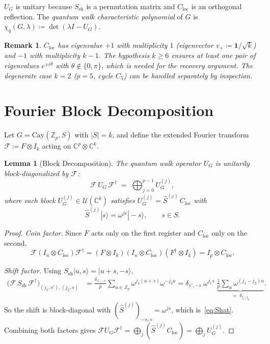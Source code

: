 \documentclass[12pt]{article}
\newtheorem{lemma}[theorem]{Lemma}
\newtheorem{remark}[theorem]{Remark}
\newcommand{\Z}{\mathbb{Z}}
\newcommand{\C}{\mathbb{C}}
\newcommand{\Cay}{\mathrm{Cay}}
\newcommand{\eqdef}{\coloneqq}
\newcommand{\ket}[1]{|#1\rangle}
\newcommand{\Uj}{U_G^{(j)}}
\newcommand{\Shat}{\hat{S}^{(j)}}
\newcommand{\cF}{\mathcal{F}}
\newcommand{\vplus}{v_+}
\begin{document}
$U_G$ is unitary because $S_{\mathrm{sh}}$ is a permutation matrix and
$C_{\mathrm{loc}}$ is an orthogonal reflection.  The \emph{quantum walk
characteristic polynomial} of $G$ is $\chi_q(G, \lambda) \eqdef
\det(\lambda I - U_G)$.

\begin{remark}\label{rem:small}
  $C_{\mathrm{loc}}$ has eigenvalue $+1$ with multiplicity $1$
  (eigenvector $\vplus \eqdef \mathbf{1}/\sqrt{k}$) and $-1$ with
  multiplicity $k-1$.  The hypothesis $k \geq 6$ ensures at least one pair
  of eigenvalues $e^{\pm i\theta}$ with $\theta \notin \{0,\pi\}$, which
  is needed for the recovery argument.  The degenerate case $k=2$
  ($p=5$, cycle $C_5$) can be handled separately by inspection.
\end{remark}

\section{Fourier Block Decomposition}
\label{sec:decomp}

Let $G = \Cay(\Z_p, S)$ with $|S| = k$, and define the extended Fourier
transform $\cF \eqdef F \otimes I_k$ acting on $\C^p \otimes \C^k$.

\begin{lemma}[Block Decomposition]\label{lem:block}
  The quantum walk operator $U_G$ is unitarily block-diagonalized by $\cF$:
  \[
    \cF\, U_G\, \cF^\dagger \;=\; \bigoplus_{j=0}^{p-1} \Uj,
  \]
  where each block $\Uj \in \mathcal{U}(\C^k)$ satisfies
  $\Uj = \Shat\, C_{\mathrm{loc}}$ with
  \begin{equation}\label{eq:Shat}
    \Shat\ket{s} = \omega^{js}\ket{-s}, \qquad s \in S.
  \end{equation}
\end{lemma}

\begin{proof}
  \textit{Coin factor.}
  Since $F$ acts only on the first register and $C_{\mathrm{loc}}$ only on
  the second,
  \[
    \cF(I_n \otimes C_{\mathrm{loc}})\cF^\dagger
    = (F \otimes I_k)(I_n \otimes C_{\mathrm{loc}})(F^\dagger \otimes I_k)
    = I_p \otimes C_{\mathrm{loc}}.
  \]

  \textit{Shift factor.}
  Using $S_{\mathrm{sh}}\ket{u,s} = \ket{u+s,-s}$,
  \begin{align*}
    \bigl(\cF\, S_{\mathrm{sh}}\,\cF^\dagger\bigr)_{(j_1,s'),(j_2,s)}
    &= \frac{\delta_{s',-s}}{p} \sum_{u \in \Z_p}
       \omega^{j_1(u+s)} \omega^{-j_2 u}
     = \delta_{s',-s}\;\omega^{j_1 s}\;
       \underbrace{\frac{1}{p}\sum_{u}\omega^{(j_1-j_2)u}}_{=\;\delta_{j_1,j_2}}.
  \end{align*}
  So the shift is block-diagonal with
  $(\hat{S}^{(j)})_{-s,s} = \omega^{js}$, which is~\eqref{eq:Shat}.
  Combining both factors gives $\cF U_G\cF^\dagger = \bigoplus_j
  (\Shat C_{\mathrm{loc}}) = \bigoplus_j \Uj$.
\end{proof}
\end{document}
